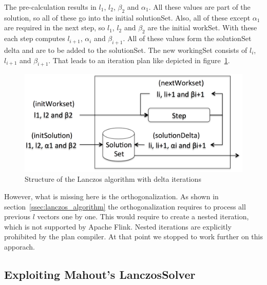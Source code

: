 The pre-calculation results in $l_1$, $l_2$, $\beta_2$ and $\alpha_1$. All
these values are part of the solution, so all of these go into the initial
solutionSet. Also, all of these except $\alpha_1$ are required in the next
step, so $l_1$, $l_2$ and $\beta_2$ are the initial workSet. With these each
step computes $l_{i+1}$, $\alpha_i$ and $\beta_{i+1}$. All of these values form
the solutionSet delta and are to be added to the solutionSet. The new
workingSet consists of  $l_{i}$, $l_{i+1}$ and $\beta_{i+1}$. That leads to an
iteration plan like depicted in figure~\ref{fig:lanczos_delta_plan}.

\begin{figure}[h]
	\centering
	\includegraphics[scale=0.3]{images/lanczos_delta_plan.png}
    \caption{Structure of the Lanczos algorithm with delta iterations}
	\label{fig:lanczos_delta_plan}
\end{figure}

However, what is missing here is the orthogonalization. As shown in
section~\ref{ssec:lanczos_algorithm} the orthogonalization requires to process
all previous $l$ vectors one by one. This would require to create a nested
iteration, which is not supported by Apache Flink. Nested iterations are
explicitly prohibited by the plan compiler. At that point we stopped to work
further on this apporach.


\subsection{Exploiting Mahout's LanczosSolver}

